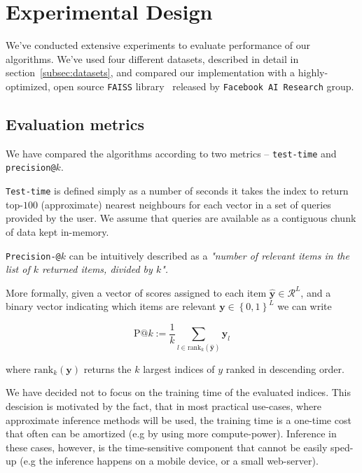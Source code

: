 \section{Experimental Design}\label{sec:experimentalDesign}

    We've conducted extensive experiments to evaluate performance of our algorithms. We've used
    four different datasets, described in detail in section~\ref{subsec:datasets}, and compared
    our implementation with a highly-optimized, open source \texttt{FAISS} library~\cite{faiss} released by
    \texttt{Facebook AI Research} group.

    \subsection{Evaluation metrics}\label{subsec:evaluationMetrics}

        We have compared the algorithms according to two metrics -- \texttt{test-time}
        and \texttt{precision@}$k$.

        \texttt{Test-time} is defined simply as a number of seconds it takes the index to return
        top-$100$ (approximate) nearest neighbours for each vector in a set of queries provided by the user.
        We assume that queries are available as a contiguous chunk of data kept in-memory.

        \texttt{Precision-@}$k$ can be intuitively described as a
        \textit{"number of relevant items in the list of $k$ returned items, divided by $k$".}

        More formally, given a vector of scores assigned to each item $\hat{\mathbf y} \in {\mathcal{R}}^{L}$, and a
        binary vector indicating which items are relevant $\mathbf y \in \left\lbrace 0, 1 \right\rbrace^L$
        we can write

        \begin{equation}
            \text{P}@k := \frac{1}{k} \sum_{l\in \text{rank}_k (\hat{\mathbf y})} \mathbf y_l
        \end{equation}

        where $\text{rank}_k(\mathbf y)$ returns the $k$ largest indices of $y$ ranked in descending order.

        We have decided not to focus on the training time of the evaluated indices. This
        descision is motivated by the fact, that in most practical use-cases, where
        approximate inference methods will be used, the training time is a one-time cost that
        often can be amortized (e.g by using more compute-power).
        Inference in these cases, however, is the time-sensitive component
        that cannot be easily sped-up (e.g the inference happens on a mobile device, or a small web-server).

